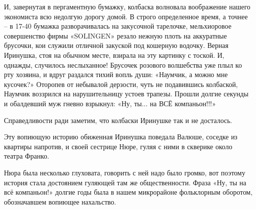 И, завернутая в пергаментную бумажку, колбаска волновала воображение нашего
экономиста всю недолгую дорогу домой. В строго определенное время, а точнее – в
17-40 бумажка разворачивалась на закусочной тарелочке, мельхиоровое
совершенство фирмы «SOLINGEN» резало нежную плоть на аккуратные брусочки, кои
служили отличной закуской под кошерную водочку. Верная Иринушка, стоя на
обычном месте, взирала на эту картинку с тоской. И, однажды, случилось
неслыханное! Брусочек розового волшебства уже плыл ко рту хозяина, и вдруг
раздался тихий вопль души: «Наумчик, а можно мне кусочек?» Оторопев от
небывалой дерзости, чуть не подавившись колбаской, Наумчик воззрился на
нарушительницу устоев трапезы. Прошли долгие секунды и обалдевший муж гневно
взрыкнул: «Ну, ты... на ВСЁ компаньон!!!»

Справедливости ради заметим, что колбаски Иринушке так и не досталось.

Эту вопиющую историю обиженная Иринушка поведала Валюше, соседке из квартиры
напротив, и своей сестрице Нюре, гуляя с ними в скверике около театра Франко.

Нюра была несколько глуховата, говорить с ней надо было громко, вот поэтому
история стала достоянием гуляющей там же общественности. Фраза «Ну, ты на всё
компаньон!» долгие годы была в нашем микрорайоне фольклорным оборотом,
обозначавшем вопиющее нахальство.

